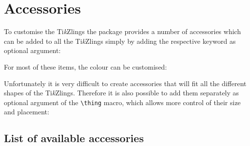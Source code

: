 \documentclass[parskip=half]{scrartcl}
\newcommand{\tikzlings}{Ti\emph{k}Zlings\xspace}
\begin{document}
\begin{tcblisting}{}
\tikzling[3D]
\end{tcblisting}

\clearpage
\section{Accessories}

To customise the \tikzlings the package provides a number of accessories which can be added to all the \tikzlings simply by adding the respective keyword as optional argument:

\begin{tcblisting}{}
\bear[hat]
\end{tcblisting}
 
For most of these items, the colour can be customised:

\begin{tcblisting}{}
\koala[crown=orange!50!yellow]
\end{tcblisting}

Unfortunately it is very difficult to create accessories that will fit all the different shapes of the \tikzlings. Therefore it is also possible to add them separately as optional argument of the \lstinline|\thing| macro, which allows more control of their size and placement:

\begin{tcblisting}{}
\owl
\thing[tophat,scale=1.5,yshift=-0.6cm,xshift=-0.05cm]
\end{tcblisting}

\subsection{List of available accessories}

\begin{tcblisting}{}
\snowman[tophat]
\end{tcblisting}

\begin{tcblisting}{}
\owl[hat]
\end{tcblisting}

\begin{tcblisting}{}
\koala[alien]
\end{tcblisting}

\begin{tcblisting}{}
\penguin[crown]
\end{tcblisting}

\begin{tcblisting}{}
\marmot[crystalball]
\end{tcblisting}

\begin{tcblisting}{}
\mouse[cheese]
\end{tcblisting}
\end{document}
